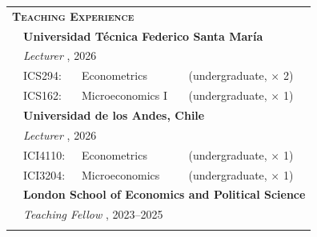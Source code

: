 \begin{tabular}{llll}
	
	\multicolumn{3}{l}{
		\large
		\textbf{%
			\textsc{%
				Teaching Experience
			}
		}
	}
	\\[2ex]
	
	\indent
	
	
	&
	\multicolumn{3}{l}{
		\textbf{%
			Universidad T\'ecnica Federico Santa Mar\'ia
		}
	}
	\\[1ex]
	
	
	&
	\multicolumn{3}{l}{
		\textit{%
			Lecturer%
		}%
		,
		2026
	}
	\\[.5ex]
	
	& ICS294:
	& Econometrics
	& (undergraduate, $\times$ 2)
	\\[.5ex]
	
	& ICS162:
	& Microeconomics I
	& (undergraduate, $\times$ 1)
	\\[1em]
	
	
	&
	\multicolumn{3}{l}{
		\textbf{%
			Universidad de los Andes, Chile
		}
	}
	\\[1ex]
	
	
	&
	\multicolumn{3}{l}{
		\textit{%
			Lecturer%
		}%
		,
		2026
	}
	\\[.5ex]
	
	& ICI4110:
	& Econometrics
	& (undergraduate, $\times$ 1)
	\\[.5ex]
	
	& ICI3204:
	& Microeconomics
	& (undergraduate, $\times$ 1)
	\\[1em]
	
	
	&
	\multicolumn{3}{l}{
		\textbf{%
			London School of Economics and Political Science
		}
	}
	\\[1ex]
	
	
	&
	\multicolumn{3}{l}{
		\textit{%
			Teaching Fellow%
		}%
		,
		2023--2025
	}
	\\[.5ex]
	
	& \hphantom{EAE250A:}
	& \hphantom{Dynamic Programming and Differential Equations}
	&
	
\end{tabular}


